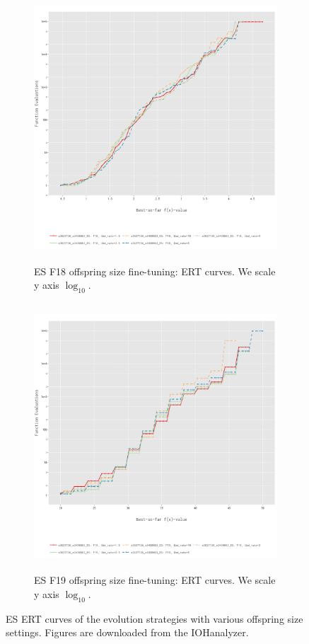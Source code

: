 \documentclass{article}
\begin{document}
\begin{figure}[!ht]
    \centering
    \begin{subfigure}[h]{0.95\linewidth}
        \includegraphics[width=\linewidth, height=10cm]{es/f18/ERT18lbd.png}
        \caption{ES F18 offspring size fine-tuning: ERT curves. We scale y axis $\log_{10}$.}
    \end{subfigure}
    \hfill
    \begin{subfigure}[h]{0.95\linewidth}
        \includegraphics[width=\linewidth, height=10cm]{es/f19/ERT19lbd.png}
        \caption{ES F19 offspring size fine-tuning: ERT curves. We scale y axis $\log_{10}$.}
    \end{subfigure}
    \caption{ES ERT curves of the evolution strategies with various offspring size settings. Figures are downloaded from the IOHanalyzer.}
    \label{fig:experi-es-osize-ert}
\end{figure}
\end{document}
